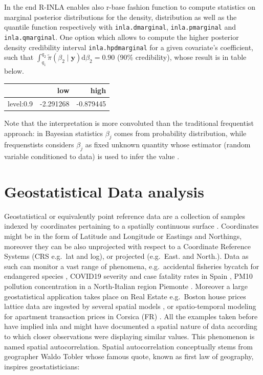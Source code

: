 \documentclass[
  12pt,
  a4paper,
  oneside]{book}
\newcommand{\passthrough}[1]{#1}
\theoremstyle{definition}
\theoremstyle{definition}
\theoremstyle{definition}
\theoremstyle{remark}
\begin{document}
In the end R-INLA enables also r-base fashion function to compute statistics on marginal posterior distributions for the density, distribution as well as the quantile function respectively with \passthrough{\lstinline!inla.dmarginal!}, \passthrough{\lstinline!inla.pmarginal!} and \passthrough{\lstinline!inla.qmarginal!}. One option which allows to compute the higher posterior density credibility interval \passthrough{\lstinline!inla.hpdmarginal!} for a given covariate's coefficient, such that \(\int_{q_{1}}^{q_{2}} \tilde{\pi}\left(\beta_{2} \mid \boldsymbol{y}\right) \mathrm{d} \beta_{2}=0.90\) (90\% credibility), whose result is in table below.

\begin{tabular}{lrr}
\toprule
  & low & high\\
\midrule
level:0.9 & -2.291268 & -0.879445\\
\bottomrule
\end{tabular}

Note that the interpretation is more convoluted \citeyearpar{wang2018bayesian} than the traditional frequentist approach: in Bayesian statistics \(\beta_{j}\) comes from probability distribution, while frequenstists considers \(\beta_{j}\) as fixed unknown quantity whose estimator (random variable conditioned to data) is used to infer the value \citeyearpar{Blangiardo-Cameletti}.

\hypertarget{prdm}{%
\chapter{Geostatistical Data analysis}\label{prdm}}

Geostatistical or equivalently point reference data are a collection of samples indexed by coordinates pertaining to a spatially continuous surface \citep{Moraga2019}. Coordinates might be in the form of Latitude and Longitude or Eastings and Northings, moreover they can be also unprojected with respect to a Coordinate Reference Systems (CRS e.g.~lat and log), or projected (e.g.~East. and North.). Data as such can monitor a vast range of phenomena, e.g.~accidental fisheries bycatch for endangered species \citep{CosandeyGodin2015}, COVID19 severity and case fatality rates in Spain \citep{Moragacovid2020}, PM10 pollution concentration in a North-Italian region Piemonte \citep{Cameletti2012}. Moreover a large geostatistical application takes place on Real Estate e.g.~Boston house prices lattice data \citep{mass} are ingested by several spatial models \citep{rubiorealestate}, or spatio-temporal modeling for apartment transaction prices in Corsica (FR) \citep{Ling}. All the examples taken before have implied inla and might have documented a spatial nature of data according to which closer observations were displaying similar values. This phenomenon is named spatial autocorrelation. Spatial autocorrelation conceptually stems from geographer Waldo Tobler whose famous quote, known as first law of geography, inspires geostatisticians:
\end{document}
